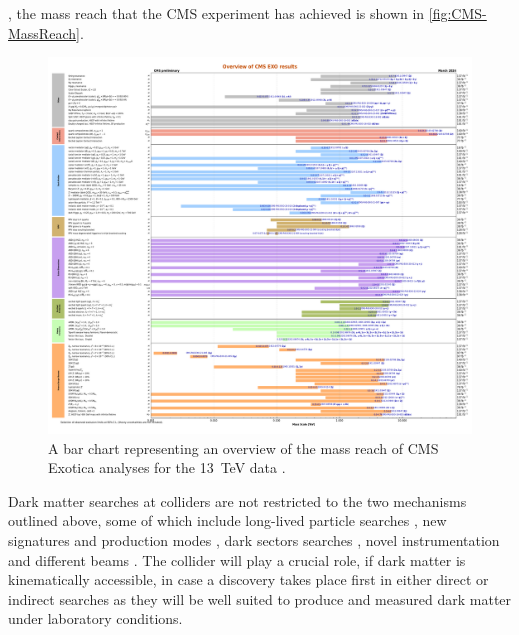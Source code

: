 , the mass reach that the CMS experiment has achieved is shown in \autoref{fig:CMS-MassReach}. 
\begin{figure}[ht!]
    \centering
    \includegraphics[width=0.9\linewidth]{figures/DMOverview/CurrentBarChartVersion_v14.pdf}
    \caption[A bar chart representing an overview of the mass reach of CMS analyses.]{A bar chart representing an overview of the mass reach of CMS Exotica analyses for the 13~TeV data \cite{CMS-MassReach}.}
    \label{fig:CMS-MassReach}
\end{figure}
\fi

Dark matter searches at colliders are not restricted to the two mechanisms outlined above, some of which include long-lived particle searches \cite{Mitsou:2021tti}, new signatures and production modes \cite{Dienes:2021cxr,tcarter:thesis}, dark sectors searches \cite{Cohen:2017pzm,ajaspan:thesis}, novel instrumentation and different beams \cite{Feng:2017uoz,Batell:2014mga}. The collider will play a crucial role, if dark matter is kinematically accessible, in case a discovery takes place first in either direct or indirect searches as they will be well suited to produce and measured dark matter under laboratory conditions.

